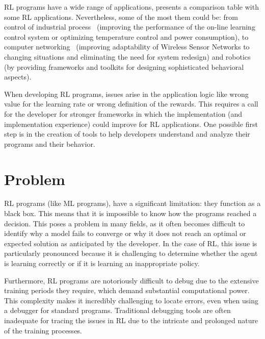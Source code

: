 \ac{RL} programs have a wide range of applications, \citet{beakcheol19} presents a comparison table with some 
\ac{RL} applications. Nevertheless, some of the most them could be: from control of industrial process~\cite{kiumarsi18} (improving 
the performance of the on-line learning control system or optimizing temperature control and power consumption),
to computer networking~\cite{alrawi13} (improving adaptability of Wireless Sensor Networks to changing situations and eliminating 
the need for system redesign) and robotics~\cite{zhang15} (by providing frameworks and toolkits for designing sophisticated 
behavioral aspects). 

When developing \ac{RL} programs, issues arise in the application logic like wrong value for the
learning rate or wrong definition of the rewards. This requires a call for the developer for stronger frameworks in which 
the implementation (and implementation experience) could improve for \ac{RL} applications. One possible first step 
is in the creation of tools to help developers understand and analyze their programs and their behavior.

\section{Problem}

\ac{RL} programs (like \ac{ML} programs), 
have a significant limitation: they function as a black box. 
This means that it is impossible to know how the programs reached a decision. This poses 
a problem in many fields, as it often becomes difficult to identify why a model 
fails to converge or why it does not reach an optimal or expected solution as 
anticipated by the developer. In the case of \ac{RL}, this issue is particularly 
pronounced because it is challenging to determine whether the agent is learning 
correctly or if it is learning an inappropriate policy.

Furthermore, \ac{RL} programs are notoriously difficult to debug due to the extensive 
training periods they require, which demand substantial computational power. This 
complexity makes it incredibly challenging to locate errors, even when using a 
debugger for standard programs. Traditional debugging tools are often inadequate 
for tracing the issues in \ac{RL} due to the intricate and prolonged nature of the 
training processes. 

